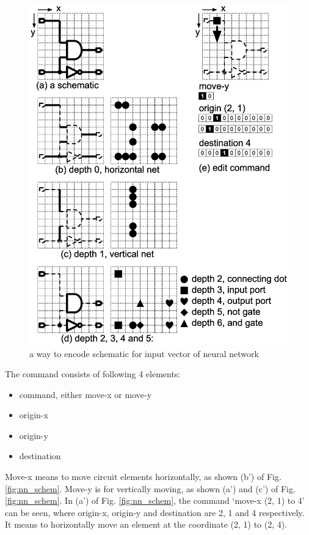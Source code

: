 \documentclass[twocolumn]{article}
\begin{document}
\begin{figure}[!tp]
 \begin{center}
  \begin{minipage}{\hsize}
   \includegraphics[width=\hsize]{fig/encode_01.eps}
   \caption{a way to encode schematic for input vector of neural network}
   \label{fig:input_encode}
  \end{minipage}
 \end{center}
\end{figure}

The command consists of following 4 elements:
\begin{itemize}
\item command, either move-x or move-y
\item origin-x
\item origin-y
\item destination
\end{itemize}
Move-x means to move circuit elements horizontally, as shown (b')
of Fig. \ref{fig:nn_schem}.
Move-y is for vertically moving, as shown (a') and (c')
of Fig. \ref{fig:nn_schem}.
In (a') of Fig. \ref{fig:nn_schem}, 
the command `move-x (2, 1) to 4' can be seen,
where origin-x, origin-y and destination are 2, 1 and 4 respectively.
It means to horizontally move an element at the coordinate (2, 1) to (2, 4).
\end{document}
